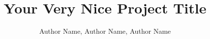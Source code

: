 \documentclass[sigplan,screen,10pt]{acmart}
\begin{document}
\title{Your Very Nice Project Title}

\author{Author Name, Author Name, Author Name}

% 

\maketitle




% 
% 
% 



\end{document}
